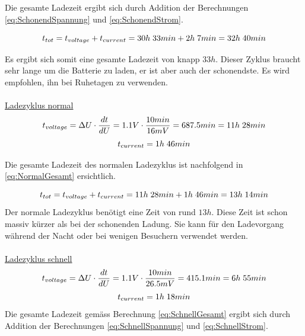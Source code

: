 Die gesamte Ladezeit ergibt sich durch Addition der Berechnungen \ref{eq:SchonendSpannung} und \ref{eq:SchonendStrom}.

\begin{equation}
\centering
t_{tot}=t_{{voltage}}+t_{current}=30h\thickspace 33min + 2h\thickspace 7min=32h\thickspace 40min
\label{eq:SchonendGesamt}
\end{equation}

Es ergibt sich somit eine gesamte Ladezeit von knapp $33h$. Dieser Zyklus braucht sehr lange um die Batterie zu laden, er ist aber auch der schonendste. Es wird empfohlen, ihn bei Ruhetagen zu verwenden.
\\
\\
\underline{Ladezyklus normal}
\begin{equation}
\centering
t_{voltage}= \Delta U \cdot \dfrac{dt}{dU}= 1.1V \cdot \dfrac{10min}{16mV} =687.5min= 11h\thickspace 28min
\label{eq:NormalSpannung}
\end{equation}
\begin{equation}
\centering
t_{current}=1h \thickspace 46min
\label{eq:NormalStrom}
\end{equation}

Die gesamte Ladezeit des normalen Ladezyklus ist nachfolgend in \ref{eq:NormalGesamt} ersichtlich.

\begin{equation}
\centering
t_{tot}=t_{voltage}+t_{current}=11h\thickspace 28min + 1h \thickspace 46min=13h\thickspace 14min
\label{eq:NormalGesamt}
\end{equation}
Der normale Ladezyklus benötigt eine Zeit von rund $13h$. Diese Zeit ist schon massiv kürzer als bei der schonenden Ladung. Sie kann für den Ladevorgang während der Nacht oder bei wenigen Besuchern verwendet werden.
\\
\\
\underline{Ladezyklus schnell}
\begin{equation}
\centering
t_{voltage}= \Delta U \cdot \dfrac{dt}{dU}= 1.1V \cdot \dfrac{10min}{26.5mV} =415.1min= 6h\thickspace 55min
\label{eq:SchnellSpannung}
\end{equation}
\begin{equation}
\centering
t_{current}= 1h\thickspace 18min
\label{eq:SchnellStrom}
\end{equation}
Die gesamte Ladezeit gemäss Berechnung \ref{eq:SchnellGesamt} ergibt sich durch Addition der Berechnungen \ref{eq:SchnellSpannung} und \ref{eq:SchnellStrom}.

